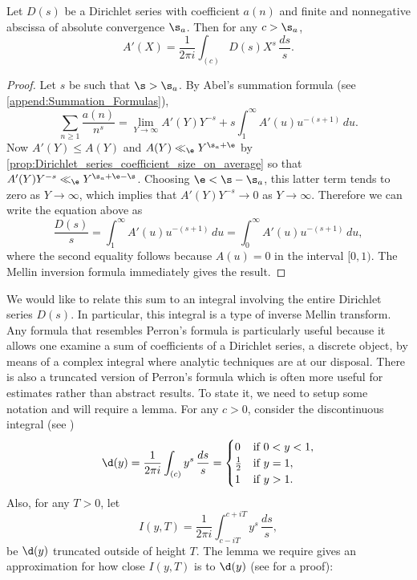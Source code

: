     \begin{theorem}
      Let $D(s)$ be a Dirichlet series with coefficient $a(n)$ and finite and nonnegative abscissa of absolute convergence $\s_{a}$. Then for any $c > \s_{a}$,
      \[
        A'(X) = \frac{1}{2\pi i}\int_{(c)}D(s)X^{s}\,\frac{ds}{s}.
      \]
    \end{theorem}
    \begin{proof}
      Let $s$ be such that $\s > \s_{a}$. By Abel's summation formula (see \cref{append:Summation_Formulas}),
      \[
        \sum_{n \ge 1}\frac{a(n)}{n^{s}} = \lim_{Y \to \infty}A'(Y)Y^{-s}+s\int_{1}^{\infty}A'(u)u^{-(s+1)}\,du.
      \]
      Now $A'(Y) \le A(Y)$ and $A(Y) \ll_{\e} Y^{\s_{a}+\e}$ by \cref{prop:Dirichlet_series_coefficient_size_on_average} so that $A'(Y)Y^{-s} \ll_{\e} Y^{\s_{a}+\e-\s}$. Choosing $\e < \s-\s_{a}$, this latter term tends to zero as $Y \to \infty$, which implies that $A'(Y)Y^{-s} \to 0$ as $Y \to \infty$. Therefore we can write the equation above as
      \[
        \frac{D(s)}{s} = \int_{1}^{\infty}A'(u)u^{-(s+1)}\,du = \int_{0}^{\infty}A'(u)u^{-(s+1)}\,du,
      \]
      where the second equality follows because $A(u) = 0$ in the interval $[0,1)$. The Mellin inversion formula immediately gives the result.
    \end{proof}

    We would like to relate this sum to an integral involving the entire Dirichlet series $D(s)$. In particular, this integral is a type of inverse Mellin transform. Any formula that resembles Perron's formula is particularly useful because it allows one examine a sum of coefficients of a Dirichlet series, a discrete object, by means of a complex integral where analytic techniques are at our disposal. There is also a truncated version of Perron's formula which is often more useful for estimates rather than abstract results. To state it, we need to setup some notation and will require a lemma. For any $c > 0$, consider the discontinuous integral (see \cite{davenport1980multiplicative})
    \[
      \d(y) = \frac{1}{2\pi i}\int_{(c)}y^{s}\,\frac{ds}{s} = \begin{cases} 0 & \text{if $0 < y < 1$}, \\ \frac{1}{2} & \text{if $y = 1$}, \\ 1 & \text{if $y > 1$}. \end{cases}
    \]
    Also, for any $T > 0$, let
    \[
      I(y,T) = \frac{1}{2\pi i}\int_{c-iT}^{c+iT}y^{s}\,\frac{ds}{s},
    \]
    be $\d(y)$ truncated outside of height $T$. The lemma we require gives an approximation for how close $I(y,T)$ is to $\d(y)$ (see \cite{davenport1980multiplicative} for a proof):

